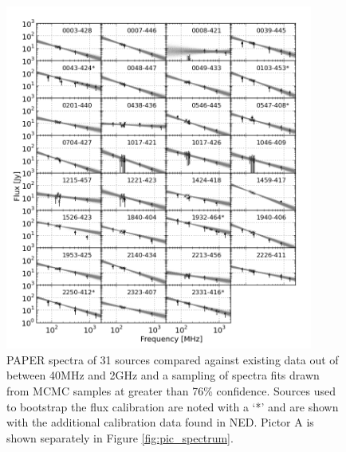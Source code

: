 \documentclass[preprint]{aastex}
\begin{document}
\begin{figure}[htbp]
\begin{center}
\includegraphics[width=0.9\textwidth]{plots/srcfig_1.png}
\end{center}
\caption{
PAPER spectra of 31 sources compared against existing data out of
\cite{Vollmer:2010p6422} between 40MHz and 2GHz and a sampling
of spectra fits drawn from MCMC samples at greater than 76\% confidence. Sources used to bootstrap the
flux calibration are noted with a `*' and are shown with the additional calibration data
found in NED. Pictor A is shown separately in Figure \ref{fig:pic_spectrum}.
\label{fig:srcs1}}
\end{figure}
\end{document}
